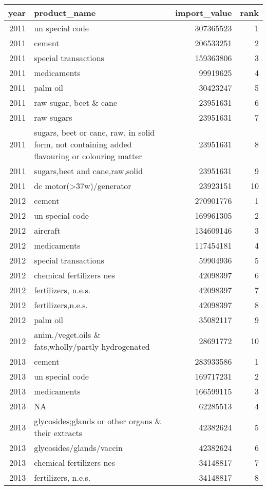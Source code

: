 \captionsetup[table]{labelformat=empty,skip=1pt}
\begin{longtable}{rlrr}
\toprule
year & product\_name & import\_value & rank \\ 
\midrule
2011 & un special code & 307365523 & 1 \\ 
2011 & cement & 206533251 & 2 \\ 
2011 & special transactions & 159363806 & 3 \\ 
2011 & medicaments & 99919625 & 4 \\ 
2011 & palm oil & 30423247 & 5 \\ 
2011 & raw sugar, beet \& cane & 23951631 & 6 \\ 
2011 & raw sugars & 23951631 & 7 \\ 
2011 & sugars, beet or cane, raw, in solid form, not containing added flavouring or colouring matter & 23951631 & 8 \\ 
2011 & sugars,beet and cane,raw,solid & 23951631 & 9 \\ 
2011 & dc motor(>37w)/generator & 23923151 & 10 \\ 
2012 & cement & 270901776 & 1 \\ 
2012 & un special code & 169961305 & 2 \\ 
2012 & aircraft & 134609146 & 3 \\ 
2012 & medicaments & 117454181 & 4 \\ 
2012 & special transactions & 59904936 & 5 \\ 
2012 & chemical fertilizers nes & 42098397 & 6 \\ 
2012 & fertilizers, n.e.s. & 42098397 & 7 \\ 
2012 & fertilizers,n.e.s. & 42098397 & 8 \\ 
2012 & palm oil & 35082117 & 9 \\ 
2012 & anim./veget.oils \& fats,wholly/partly hydrogenated & 28691772 & 10 \\ 
2013 & cement & 283933586 & 1 \\ 
2013 & un special code & 169717231 & 2 \\ 
2013 & medicaments & 166599115 & 3 \\ 
2013 & NA & 62285513 & 4 \\ 
2013 & glycosides;glands or other organs \& their extracts & 42382624 & 5 \\ 
2013 & glycosides/glands/vaccin & 42382624 & 6 \\ 
2013 & chemical fertilizers nes & 34148817 & 7 \\ 
2013 & fertilizers, n.e.s. & 34148817 & 8 \\ 

\end{longtable}
